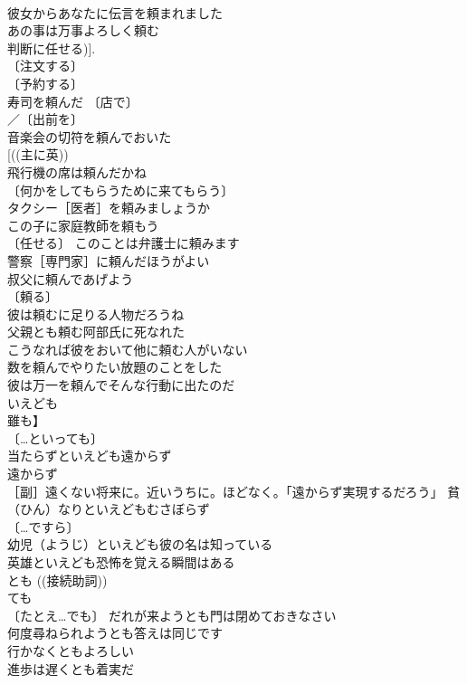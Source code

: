 \documentclass[8pt]{extreport}
\begin{document}
\begin{CJK}{UTF8}{min}
\\	彼女からあなたに伝言を頼まれました 
\\	あの事は万事よろしく頼む 
\\	判断に任せる)]. 
\\	〔注文する〕
\\	〔予約する〕
\\	寿司を頼んだ 〔店で〕
\\	／〔出前を〕
\\	音楽会の切符を頼んでおいた 
\\	[((主に英))
\\	飛行機の席は頼んだかね 
\\	〔何かをしてもらうために来てもらう〕
\\	タクシー［医者］を頼みましょうか 
\\	この子に家庭教師を頼もう 
\\	〔任せる〕 このことは弁護士に頼みます 
\\	警察［専門家］に頼んだほうがよい 
\\	叔父に頼んであげよう 
\\	〔頼る〕
\\	彼は頼むに足りる人物だろうね 
\\	父親とも頼む阿部氏に死なれた 
\\	こうなれば彼をおいて他に頼む人がいない 
\\	数を頼んでやりたい放題のことをした 
\\	彼は万一を頼んでそんな行動に出たのだ 
\\	いえども	
\\	雖も】	
\\	〔…といっても〕
\\	当たらずといえども遠からず
\\	遠からず　
\\	［副］遠くない将来に。近いうちに。ほどなく。「遠からず実現するだろう」 貧（ひん）なりといえどもむさぼらず 
\\	〔…ですら〕
\\	幼児（ようじ）といえども彼の名は知っている 
\\	英雄といえども恐怖を覚える瞬間はある 
\\	とも		((接続助詞))
\\	ても 
\\	〔たとえ…でも〕 だれが来ようとも門は閉めておきなさい 
\\	何度尋ねられようとも答えは同じです 
\\	行かなくともよろしい 
\\	進歩は遅くとも着実だ 

\end{CJK}
\end{document}
